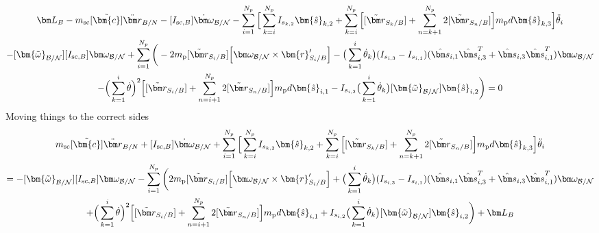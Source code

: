 \begin{multline}
	\bm L_B - m_{\text{sc}}[\tilde{\bm{c}}]\ddot{\bm r}_{B/N} -[I_{\text{sc},B}] \dot{\bm\omega}_{\cal B/N} - \sum\limits_{i=1}^{N_p} \Big[\sum^{N_p}_{k=i}I_{s_{k,2}} \bm{\hat{s}}_{k,2} + \sum\limits_{k=i}^{N_p}\Big[ [\tilde{{\bm r}}_{S_{k}/B}] + \sum\limits_{n=k+1}^{N_p}2[\tilde{{\bm r}}_{S_{n}/B}]\Big]m_{\text{p}} d \bm{\hat{s}}_{k,3} \Big] \ddot{\theta}_i \\
	-[\bm{\tilde{\omega}}_{\cal B/N}] [I_{\text{sc},B}] \bm\omega_{\cal B/N}
	+ \sum\limits_{i=1}^{N_p}\bigg(- 2 m_{\text{p}} [\tilde{{\bm r}}_{S_{i}/B}] \Big[\bm\omega_{\cal B/N} \times \bm{r}'_{S_i/B}\Big] -\big(\sum^{i}_{k=1}\dot{\theta}_k\big)(I_{s_{i,3}}-I_{s_{i,1}})(\hat{\bm s}_{i,1}\hat{\bm s}_{i,3}^{T}+\hat{\bm s}_{i,3}\hat{\bm s}_{i,1}^{T}) \bm\omega_{\cal B/N} \\
	- \Big( \sum\limits_{k=1}^{i} \dot{\theta}\Big)^2 \Big[[\tilde{{\bm r}}_{S_{i}/B}] + \sum\limits_{n=i+1}^{N_p}2[\tilde{{\bm r}}_{S_{n}/B}]\Big] m_{\text{p}} d \bm{\hat{s}}_{i,1}
	- I_{s_{i,2}} \big(\sum^{i}_{k=1}\dot{\theta}_k\big) [\bm{\tilde{\omega}}_{\cal B/N}] \bm{\hat{s}}_{i,2} \bigg) = 0
\end{multline}
Moving things to the correct sides
\begin{multline}
	m_{\text{sc}}[\tilde{\bm{c}}]\ddot{\bm r}_{B/N} + [I_{\text{sc},B}] \dot{\bm\omega}_{\cal B/N} + \sum\limits_{i=1}^{N_p} \Big[\sum^{N_p}_{k=i}I_{s_{k,2}} \bm{\hat{s}}_{k,2} + \sum\limits_{k=i}^{N_p}\Big[ [\tilde{{\bm r}}_{S_{k}/B}] + \sum\limits_{n=k+1}^{N_p}2[\tilde{{\bm r}}_{S_{n}/B}]\Big]m_{\text{p}} d \bm{\hat{s}}_{k,3} \Big] \ddot{\theta}_i \\
	= -[\bm{\tilde{\omega}}_{\cal B/N}] [I_{\text{sc},B}] \bm\omega_{\cal B/N} - \sum\limits_{i=1}^{N_p}\bigg(2 m_{\text{p}} [\tilde{{\bm r}}_{S_{i}/B}] \Big[\bm\omega_{\cal B/N} \times \bm{r}'_{S_i/B}\Big] + \big(\sum^{i}_{k=1}\dot{\theta}_k\big)(I_{s_{i,3}}-I_{s_{i,1}})(\hat{\bm s}_{i,1}\hat{\bm s}_{i,3}^{T}+\hat{\bm s}_{i,3}\hat{\bm s}_{i,1}^{T}) \bm\omega_{\cal B/N} \\
	+ \Big( \sum\limits_{k=1}^{i} \dot{\theta}\Big)^2 \Big[[\tilde{{\bm r}}_{S_{i}/B}] + \sum\limits_{n=i+1}^{N_p}2[\tilde{{\bm r}}_{S_{n}/B}]\Big] m_{\text{p}} d \bm{\hat{s}}_{i,1}
	+ I_{s_{i,2}} \big(\sum^{i}_{k=1}\dot{\theta}_k\big) [\bm{\tilde{\omega}}_{\cal B/N}] \bm{\hat{s}}_{i,2} \bigg) + \bm L_B
\end{multline}

